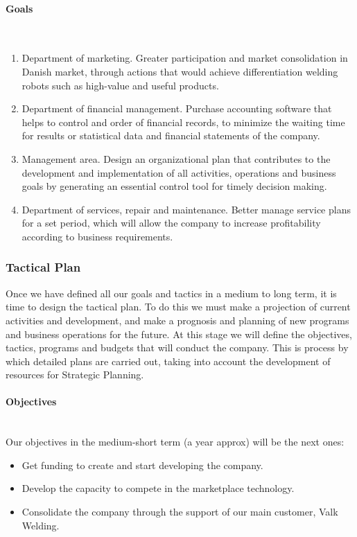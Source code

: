 \paragraph*{Goals}~\\

\begin{enumerate}
\item Department of marketing. 
      Greater participation and market consolidation in Danish market, through actions that would achieve differentiation welding robots such as high-value and useful products.
\item Department of financial management. 
      Purchase accounting software that helps to control and order of financial records, to minimize the waiting time for results or statistical data and financial statements of the company.
\item Management area. Design an organizational plan that contributes to the development and implementation of all activities, operations and business goals by generating an essential control tool for timely decision making.
\item Department of services, repair and maintenance. Better manage service plans for a set period, which will allow the company to increase profitability according to business requirements.
\end{enumerate}


\subsubsection{Tactical Plan}
Once we have defined all our goals and tactics in a medium to long term, it is time to design the tactical plan. To do this we must make a projection of current activities and development, and make a prognosis and planning of new programs and business operations for the future. At this stage we will define the objectives, tactics, programs and budgets that will conduct the company. This is process by which detailed plans are carried out, taking into account the development of resources for Strategic Planning.

\paragraph*{Objectives}~\\
Our objectives in the medium-short term (a year approx) will be the next ones:
\begin{itemize}[-]
\item Get funding to create and start developing the company.
\item Develop the capacity to compete in the marketplace technology.
\item Consolidate the company through the support of our main customer, Valk Welding.
\end{itemize}

